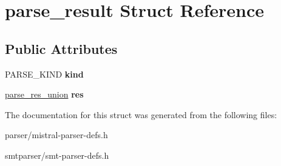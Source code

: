 \hypertarget{structparse__result}{\section{parse\-\_\-result \-Struct \-Reference}
\label{structparse__result}
}
\subsection*{\-Public \-Attributes}
\begin{DoxyCompactItemize}
\item 
\hypertarget{structparse__result_aed1a4ff6458f5ec2733581b60c350588}{\-P\-A\-R\-S\-E\-\_\-\-K\-I\-N\-D {\bfseries kind}}\label{structparse__result_aed1a4ff6458f5ec2733581b60c350588}

\item 
\hypertarget{structparse__result_a906c64fe973951f0b44e3a38017ff579}{\hyperlink{unionparse__res__union}{parse\-\_\-res\-\_\-union} {\bfseries res}}\label{structparse__result_a906c64fe973951f0b44e3a38017ff579}

\end{DoxyCompactItemize}


\-The documentation for this struct was generated from the following files\-:\begin{DoxyCompactItemize}
\item 
parser/mistral-\/parser-\/defs.\-h\item 
smtparser/smt-\/parser-\/defs.\-h\end{DoxyCompactItemize}
